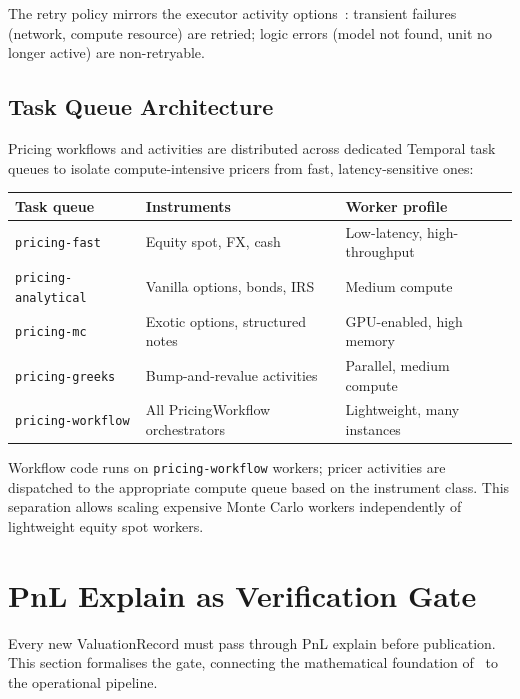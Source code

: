 \documentclass[11pt,a4paper]{article}
\begin{document}
\noindent The retry policy mirrors the executor activity options~\cite[\S14.2]{ledger}: transient failures (network, compute resource) are retried; logic errors (model not found, unit no longer active) are non-retryable.

\subsection{Task Queue Architecture}

Pricing workflows and activities are distributed across dedicated Temporal task queues to isolate compute-intensive pricers from fast, latency-sensitive ones:

\begin{center}
\small
\begin{tabular}{l l l}
\toprule
\textbf{Task queue} & \textbf{Instruments} & \textbf{Worker profile} \\
\midrule
\texttt{pricing-fast} & Equity spot, FX, cash & Low-latency, high-throughput \\
\texttt{pricing-analytical} & Vanilla options, bonds, IRS & Medium compute \\
\texttt{pricing-mc} & Exotic options, structured notes & GPU-enabled, high memory \\
\texttt{pricing-greeks} & Bump-and-revalue activities & Parallel, medium compute \\
\texttt{pricing-workflow} & All PricingWorkflow orchestrators & Lightweight, many instances \\
\bottomrule
\end{tabular}
\end{center}

\noindent Workflow code runs on \texttt{pricing-workflow} workers; pricer activities are dispatched to the appropriate compute queue based on the instrument class.  This separation allows scaling expensive Monte Carlo workers independently of lightweight equity spot workers.

\clearpage
\section{PnL Explain as Verification Gate}
\label{sec:pnl-explain}

Every new ValuationRecord must pass through PnL explain before publication.  This section formalises the gate, connecting the mathematical foundation of~\cite{pnl_explain} to the operational pipeline.
\end{document}
